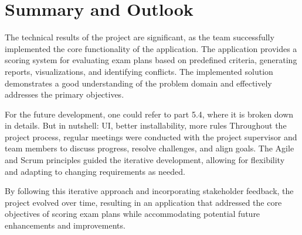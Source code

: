 \section{Summary and Outlook}

The technical results of the project are significant, as the team successfully implemented the core functionality of the application. The application provides a scoring system for evaluating exam plans based on predefined criteria, generating reports, visualizations, and identifying conflicts. The implemented solution demonstrates a good understanding of the problem domain and effectively addresses the primary objectives. 


\vspace{\baselineskip}


For the future development, one could refer to part 5.4, where it is broken down in details. But in nutshell: UI, better installability, more rules
Throughout the project process, regular meetings were conducted with the project supervisor and team members to discuss progress, resolve challenges, and align goals. The Agile and Scrum principles guided the iterative development, allowing for flexibility and adapting to changing requirements as needed.




\vspace{\baselineskip}


By following this iterative approach and incorporating stakeholder feedback, the project evolved over time, resulting in an application that addressed the core objectives of scoring exam plans while accommodating potential future enhancements and improvements.